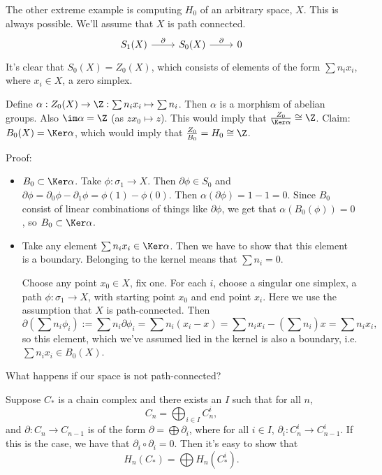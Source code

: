 \begin{eg}
    The other extreme example is computing $H_0$ of an arbitrary space, $X$.
    This is always possible.
    We'll assume that $X$ is path connected.
    \[
        \begin{tikzcd}
            S_1(X) \arrow[r, "\partial"] & S_0(X) \arrow[r, "\partial"] & 0
        \end{tikzcd}
    \]
    It's clear that $S_0(X) = Z_0(X)$, which consists of elements of the form $\sum n_i x_i$, where  $x_i \in X$, a zero simplex.

    Define $\alpha: Z_0(X) \to  \Z: \sum n_i x_i \mapsto \sum n_i$.
    Then $\alpha$ is a morphism of abelian groups.
    Also $\im \alpha = \Z$ (as $z x_0 \mapsto z$).
    This would imply that $\frac{Z_0}{\Ker \alpha} \cong \Z$.
    Claim: $B_0(X) = \Ker \alpha$, which would imply that $\frac{Z_0}{B_0} = H_0 \cong \Z$.

    Proof:
    \begin{itemize}
        \item $B_0 \subset \Ker \alpha$.
            Take $\phi: \sigma_1 \to  X$.
            Then $\partial \phi \in S_0$ and $\partial\phi = \partial_0\phi - \partial_1\phi = \phi(1) - \phi(0)$.
            Then $\alpha(\partial\phi) = 1 - 1 = 0$. Since $B_0$ consist of linear combinations of things like $\partial \phi$, we get that $\alpha(B_0(\phi)) = 0$, so $B_0\subset  \Ker \alpha$.
        \item Take any element $\sum n_i x_i \in \Ker \alpha$.
            Then  we have to show that this element is a boundary.
            Belonging to the kernel means that $\sum n_i = 0$.

            Choose any point $x_0 \in X$, fix one.
            For each $i$, choose a singular one simplex, a path $\phi: \sigma_1 \to  X$, with starting point $x_0$ and end point $x_i$.
            Here we use the assumption that $X$ is path-connected.
            Then
            \[
                \partial(\sum n_i \phi_i) := \sum n_i \partial\phi_i = 
                \sum n_i (x_i - x) = \sum n_i x_i - \left(\sum n_i\right) x = \sum n_i x_i
            ,\] 
            so this element, which we've assumed lied in the kernel is also a boundary, i.e. $\sum n_i x_i \in B_0(X)$.
    \end{itemize}
\end{eg}


What happens if our space is not path-connected?

Suppose $C_*$ is a chain complex and there exists an $I$ such that for all $n$, 
\[
C_n = \bigoplus_{i \in I} C_n^{i}
,\] 
and $\partial: C_n \to  C_{n-1}$ is of the form $\partial = \bigoplus \partial_i$,
where for all $i \in I$, $\partial_i: C_n^{i} \to  C_{n-1}^{i}$.
If this is the case, we have that $\partial_i  \circ  \partial_i = 0$.
Then it's easy to show that
\[
    H_n(C_*) = \bigoplus H_n(C_*^{i})
.\] 


